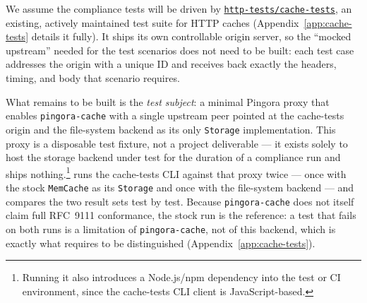 %
%

We assume the compliance tests will be driven by
\href{https://github.com/http-tests/cache-tests}{\texttt{http-tests/cache-tests}},
an existing, actively maintained test suite for HTTP caches (Appendix~\ref{app:cache-tests}
details it fully). It ships its own controllable origin server, so the ``mocked
upstream'' needed for the test scenarios does not need to be built: each test
case addresses the origin with a unique ID and receives back exactly the
headers, timing, and body that scenario requires.

What remains to be built is the \emph{test subject}: a minimal Pingora proxy
that enables \texttt{pingora-cache} with a single upstream peer pointed at the
cache-tests origin and the file-system backend as its only \texttt{Storage}
implementation. This proxy is a disposable test fixture, not a project
deliverable --- it exists solely to host the storage backend under test for
the duration of a compliance run and ships nothing.\footnote{Running it also
introduces a Node.js/npm dependency into the test or CI environment, since the
cache-tests CLI client is JavaScript-based.} 
runs the cache-tests CLI against that proxy twice --- once with the stock
\texttt{MemCache} as its \texttt{Storage} and once with the file-system
backend --- and compares the two result sets test by test. Because
\texttt{pingora-cache} does not itself claim full RFC~9111 conformance, the
stock run is the reference: a test that fails on both runs is a limitation of
\texttt{pingora-cache}, not of this backend, which is exactly what
 requires to be distinguished
(Appendix~\ref{app:cache-tests}).

